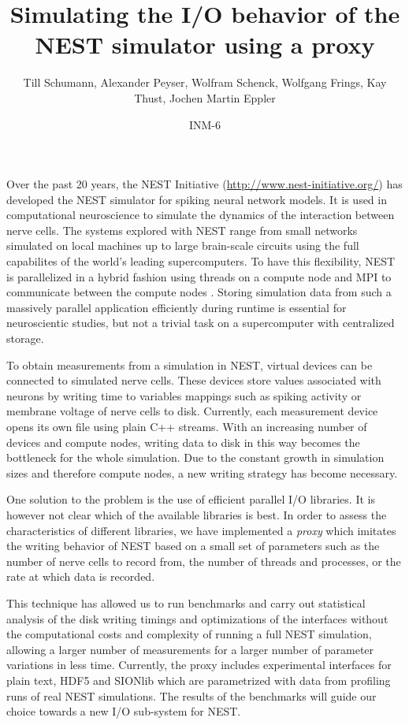 \documentclass{article}
\title{Simulating the I/O behavior of the NEST simulator using a proxy}
\author{Till Schumann, Alexander Peyser, Wolfram Schenck, Wolfgang Frings, Kay Thust, Jochen Martin Eppler}
\date{INM-6}
\begin{document}
\maketitle

Over the past 20 years, the NEST Initiative
(\url{http://www.nest-initiative.org/}) has developed the NEST
\cite{NEST} simulator for spiking neural network models. It is used in
computational neuroscience to simulate the dynamics of the interaction
between nerve cells. The systems explored with NEST range from small
networks simulated on local machines up to large brain-scale circuits
using the full capabilites of the world's leading supercomputers. To
have this flexibility, NEST is parallelized in a hybrid fashion
using threads on a compute node and MPI to communicate between the
compute nodes \cite{Plesser07}.  Storing simulation data from such a
massively parallel application efficiently during runtime is essential
for neuroscientic studies, but not a trivial task on a supercomputer
with centralized storage.

To obtain measurements from a simulation in NEST, virtual devices can
be connected to simulated nerve cells. These devices store values
associated with neurons by writing time to variables mappings such as
spiking activity or membrane voltage of nerve cells to
disk. Currently, each measurement device opens its own file using
plain C++ streams.  With an increasing number of devices and compute
nodes, writing data to disk in this way becomes the bottleneck for the
whole simulation. Due to the constant growth in simulation sizes and
therefore compute nodes, a new writing strategy has become necessary.

One solution to the problem is the use of efficient parallel I/O
libraries. It is however not clear which of the available libraries
is best. In order to assess the characteristics of different
libraries, we have implemented a \emph{proxy} which imitates the writing
behavior of NEST based on a small set of parameters such as the number
of nerve cells to record from, the number of threads and processes, or
the rate at which data is recorded.

This technique has allowed us to run benchmarks and carry out
statistical analysis of the disk writing timings and optimizations of
the interfaces without the computational costs and complexity of
running a full NEST simulation, allowing a larger number of
measurements for a larger number of parameter variations in less
time. Currently, the proxy includes experimental interfaces for plain
text, HDF5 \cite{hdf2010hierarchical} and SIONlib
\cite{frings2009scalable} which are parametrized with data from
profiling runs of real NEST simulations. The results of the benchmarks
will guide our choice towards a new I/O sub-system for NEST.




\end{document}

